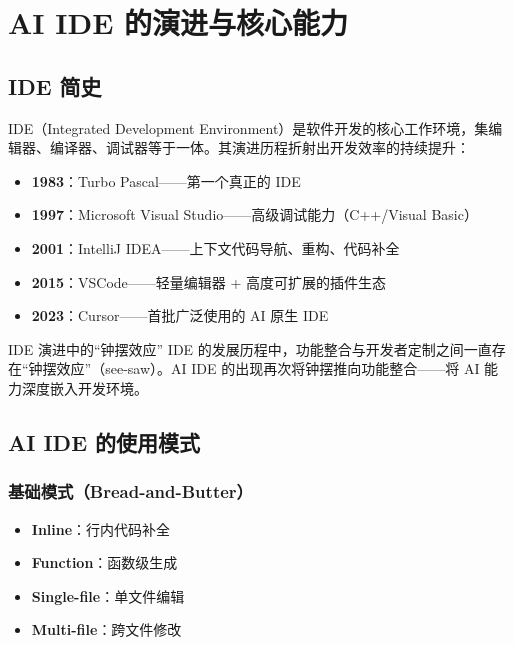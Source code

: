 \section{AI IDE 的演进与核心能力}

\subsection{IDE 简史}

IDE（Integrated Development Environment）是软件开发的核心工作环境，集编辑器、编译器、调试器等于一体。其演进历程折射出开发效率的持续提升：

\begin{itemize}
    \item \textbf{1983}：Turbo Pascal——第一个真正的 IDE
    \item \textbf{1997}：Microsoft Visual Studio——高级调试能力（C++/Visual Basic）
    \item \textbf{2001}：IntelliJ IDEA——上下文代码导航、重构、代码补全
    \item \textbf{2015}：VSCode——轻量编辑器 + 高度可扩展的插件生态
    \item \textbf{2023}：Cursor——首批广泛使用的 AI 原生 IDE
\end{itemize}

\begin{knowledgebox}{IDE 演进中的``钟摆效应''}
IDE 的发展历程中，功能整合与开发者定制之间一直存在``钟摆效应''（see-saw）。AI IDE 的出现再次将钟摆推向功能整合——将 AI 能力深度嵌入开发环境。
\end{knowledgebox}

\subsection{AI IDE 的使用模式}

\subsubsection{基础模式（Bread-and-Butter）}

\begin{itemize}
    \item \textbf{Inline}：行内代码补全
    \item \textbf{Function}：函数级生成
    \item \textbf{Single-file}：单文件编辑
    \item \textbf{Multi-file}：跨文件修改
\end{itemize}

